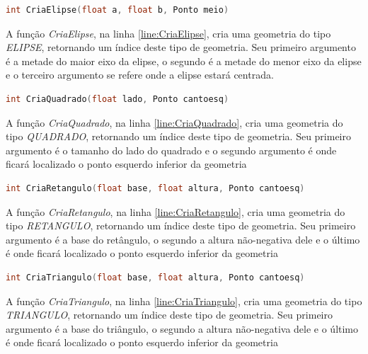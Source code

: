 \begin{lstlisting}[label={func:CriaElipse},language=C++]
int CriaElipse(float a, float b, Ponto meio)
\end{lstlisting}
A função \emph{CriaElipse}, na linha \ref{line:CriaElipse}, cria uma geometria do tipo \emph{ELIPSE}, retornando um índice deste tipo de geometria. Seu primeiro argumento é a metade do maior eixo da elipse, o segundo é a metade do menor eixo da elipse e o terceiro argumento se refere onde a elipse estará centrada.

\begin{lstlisting}[label={func:CriaQuadrado},language=C++]
int CriaQuadrado(float lado, Ponto cantoesq)
\end{lstlisting}
A função \emph{CriaQuadrado}, na linha \ref{line:CriaQuadrado}, cria uma geometria do tipo \emph{QUADRADO}, retornando um índice deste tipo de geometria. Seu primeiro argumento é o tamanho do lado do quadrado e o segundo argumento é onde ficará localizado o ponto esquerdo inferior da geometria

\begin{lstlisting}[label={func:CriaRetangulo},language=C++]
int CriaRetangulo(float base, float altura, Ponto cantoesq)
\end{lstlisting}
A função \emph{CriaRetangulo}, na linha \ref{line:CriaRetangulo}, cria uma geometria do tipo \emph{RETANGULO}, retornando um índice deste tipo de geometria. Seu primeiro argumento é a base do retângulo, o segundo a altura não-negativa dele e o último é onde ficará localizado o ponto esquerdo inferior da geometria

\begin{lstlisting}[label={func:CriaTriangulo},language=C++]
int CriaTriangulo(float base, float altura, Ponto cantoesq)
\end{lstlisting}
A função \emph{CriaTriangulo}, na linha \ref{line:CriaTriangulo}, cria uma geometria do tipo \emph{TRIANGULO}, retornando um índice deste tipo de geometria. Seu primeiro argumento é a base do triângulo, o segundo a altura não-negativa dele e o último é onde ficará localizado o ponto esquerdo inferior da geometria

